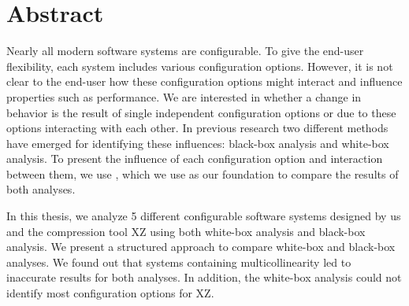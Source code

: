 \begingroup
\let\clearpage\relax
\let\cleardoublepage\relax
\let\cleardoublepage\relax

\chapter*{Abstract}
Nearly all modern software systems are configurable. To give the end-user flexibility, each system includes various configuration options.
However, it is not clear to the end-user how these configuration options might interact and influence properties such as performance. 
We are interested in whether a change in behavior is the result of single independent configuration options or due to these options
interacting with each other.
In previous research two different methods have emerged for identifying these influences: black-box analysis and white-box analysis.
To present the influence of each configuration option and interaction between them, we use {\perfInfluenceModel}, which we use as our foundation
to compare the results of both analyses.

In this thesis, we analyze 5 different configurable software systems designed by us and the compression tool \textsc{XZ} using both white-box analysis
and black-box analysis. We present a structured approach to compare white-box and black-box analyses. 
We found out that systems containing multicollinearity led to inaccurate results for both analyses. 
In addition, the white-box analysis could not identify most configuration options for \textsc{XZ}.
\vfill

\endgroup

\vfill
